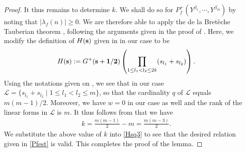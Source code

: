 \documentclass[twoside,leqno,10pt, A4]{amsart}
\begin{document}
\begin{proof}
  It thus remains to determine $k$. We shall do so for $P^+_f(Y^{\beta_1}, \cdots, Y^{\beta_m})$ by noting that $|\lambda_f(n)| \geq 0$. We are therefore able to apply the de la Bret\`{e}che Tauberian theorem \cite{Breteche}, following the arguments given in the proof of \cite[Theorem 1.3]{Toma}. Here, we modify the definition of $H({\bf s})$ given in \cite[(4.1)]{Toma} in our case to be
\begin{align*}
H({\bf s}):=G^+({\bf s} + {\bf 1/2})\left( \prod_{1 \leq l_1 <l_2 \leq 2k}(s_{l_1}+s_{l_2}) \right).
\end{align*}
  Using the notations given on \cite[Theorem 4.1--4.2]{Toma},  we see that in our case $\mathcal{L} = \{s_{l_1}+s_{l_2} \mid 1 \leq l_1<l_2 \leq m \}$, so that the cardinality $q$ of $\mathcal{L}$ equals $m(m-1)/2$. Moreover, we have $w=0$ in our case as well and the rank of the linear forms in $\mathcal{L}$ is $m$. It thus follows from \cite[(iv) of Th\'{e}or\`{e}me 2]{Breteche} that we have
\begin{align*}
 k=\frac {m(m-1)}{2}-m=\frac {m(m-3)}{2}.
\end{align*}
  We substitute the above value of $k$ into \eqref{Hsq3} to see that the desired relation given in \eqref{Pfest} is valid. This completes the proof of the lemma.
\end{proof}
\end{document}
